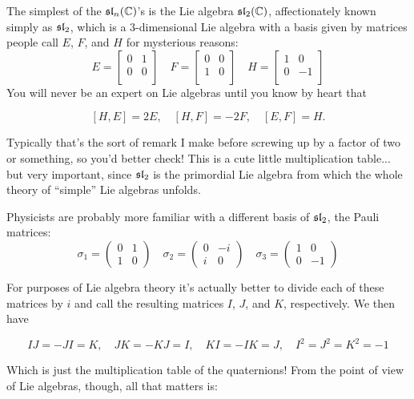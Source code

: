 The simplest of the $\mathfrak{sl}_n(\mathbb C)$'s is the Lie algebra $\mathfrak{sl}_2(\mathbb C)$, affectionately known simply as $\mathfrak{sl}_2$, which is a 3-dimensional Lie algebra with a basis given by matrices people call $E$, $F$, and $H$ for mysterious reasons:
\[
E = \begin{bmatrix}
    0 & 1 \\
    0 & 0 \\
  \end{bmatrix}
\quad
F =
  \begin{bmatrix}
    0 & 0 \\
    1 & 0 \\
  \end{bmatrix}
\quad
H = 
  \begin{bmatrix}
    1 & 0 \\
    0 & -1 \\
  \end{bmatrix}
\]
You will never be an expert on Lie algebras until you know by heart that

\[[H,E] = 2E, \quad [H,F] = -2F, \quad [E,F]  = H.\]

Typically that's the sort of remark I make before screwing up by a factor of two or something, so you'd better check!  This is a cute little multiplication table... but very important, since $\mathfrak{sl}_2$ is the primordial Lie algebra from which the whole theory of ``simple'' Lie algebras unfolds.

Physicists are probably more familiar with a different basis of $\mathfrak{sl}_2$, the Pauli matrices: 
\[
\sigma_1 = \begin{pmatrix} 
0 & 1 \\
1 & 0 
\end{pmatrix}
\quad
\sigma_2 = \begin{pmatrix} 
0 & -i \\
i & 0 
\end{pmatrix}
\quad
\sigma_3 = \begin{pmatrix} 
1 & 0 \\
0 & -1 
\end{pmatrix} \]

For purposes of Lie algebra theory it's actually better to divide each of these matrices by $i$ and call the resulting matrices $I$, $J$, and $K$, respectively.  We then have

\[IJ = -JI = K, \quad JK = -KJ = I, \quad KI = -IK = J, \quad I^2 = J^2 = K^2 = -1\]

Which is just the multiplication table of the quaternions!  From the point of view of Lie algebras, though, all that matters is:

